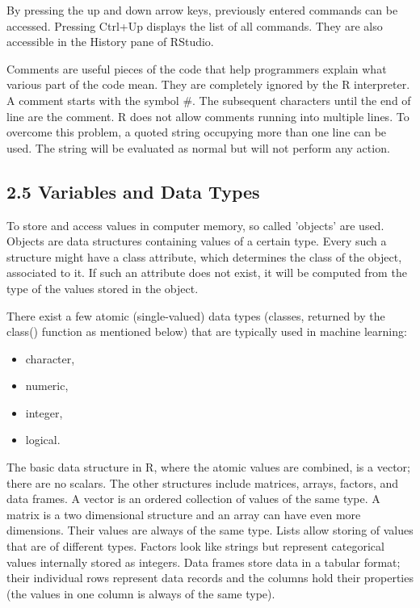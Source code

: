\documentclass[10pt]{book}
\begin{document}
By pressing the up and down arrow keys, previously entered commands can be accessed. Pressing Ctrl+Up displays the list of all commands. They are also accessible in the History pane of RStudio.

Comments are useful pieces of the code that help programmers explain what various part of the code mean. They are completely ignored by the R interpreter. A comment starts with the symbol \#. The subsequent characters until the end of line are the comment. R does not allow comments running into multiple lines. To overcome this problem, a quoted string occupying more than one line can be used. The string will be evaluated as normal but will not perform any action.

\subsection*{2.5 Variables and Data Types}
To store and access values in computer memory, so called 'objects' are used. Objects are data structures containing values of a certain type. Every such a structure might have a class attribute, which determines the class of the object, associated to it. If such an attribute does not exist, it will be computed from the type of the values stored in the object.

There exist a few atomic (single-valued) data types (classes, returned by the class() function as mentioned below) that are typically used in machine learning:

\begin{itemize}
  \item character,
  \item numeric,
  \item integer,
  \item logical.
\end{itemize}

The basic data structure in R, where the atomic values are combined, is a vector; there are no scalars. The other structures include matrices, arrays, factors, and data frames. A vector is an ordered collection of values of the same type. A matrix is a two dimensional structure and an array can have even more dimensions. Their values are always of the same type. Lists allow storing of values that are of different types. Factors look like strings but represent categorical values internally stored as integers. Data frames store data in a tabular format; their individual rows represent data records and the columns hold their properties (the values in one column is always of the same type).
\end{document}
